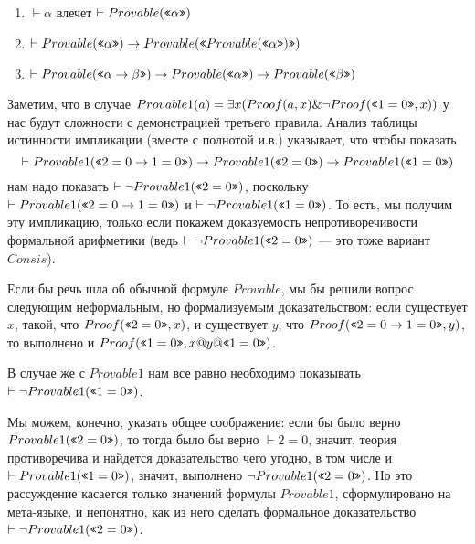\begin{enumerate}
\item $\vdash \alpha$ влечет $\vdash Provable(\texttt{<<}\alpha\texttt{>>})$
\item $\vdash Provable (\texttt{<<}\alpha\texttt{>>}) \rightarrow Provable(\texttt{<<}Provable(\texttt{<<}\alpha\texttt{>>})\texttt{>>})$
\item $\vdash Provable (\texttt{<<}\alpha\rightarrow \beta\texttt{>>})\rightarrow Provable(\texttt{<<}\alpha\texttt{>>}) \rightarrow Provable(\texttt{<<}\beta\texttt{>>})$
\end{enumerate}

Заметим, что в случае $Provable1(a) = \exists x (Proof (a,x) \& \neg Proof (\texttt{<<}1=0\texttt{>>},x))$
у нас будут сложности с демонстрацией третьего правила. 
Анализ таблицы истинности импликации (вместе с полнотой и.в.)
указывает, что чтобы показать 
$$\vdash Provable1 (\texttt{<<}2=0\rightarrow 1=0\texttt{>>}) \rightarrow Provable1 (\texttt{<<}2=0\texttt{>>}) \rightarrow Provable1 (\texttt{<<}1=0\texttt{>>})$$
нам надо показать $\vdash \neg Provable1 (\texttt{<<}2=0\texttt{>>})$,
поскольку $\vdash Provable1 (\texttt{<<}2=0\rightarrow 1=0\texttt{>>})$ и $\vdash \neg Provable1 (\texttt{<<}1=0\texttt{>>})$. 
То есть, мы получим эту импликацию, только если покажем доказуемость непротиворечивости формальной арифметики
(ведь $\vdash \neg Provable1 (\texttt{<<}2=0\texttt{>>})$ --- это тоже вариант $Consis$).

Если бы речь шла об обычной формуле $Provable$, мы бы решили вопрос следующим неформальным, но формализуемым
доказательством:
если существует $x$, такой, что $Proof (\texttt{<<}2=0\texttt{>>},x)$, 
и существует $y$, что $Proof(\texttt{<<}2=0\rightarrow 1=0\texttt{>>},y)$, 
то выполнено и $Proof (\texttt{<<}1=0\texttt{>>},x @ y @ \texttt{<<}1=0\texttt{>>})$.


В случае же с $Provable1$ нам все равно необходимо показывать $\vdash \neg Provable1 (\texttt{<<}1=0\texttt{>>})$.

Мы можем, конечно, указать общее соображение: если бы было верно $Provable1 (\texttt{<<}2=0\texttt{>>})$, то 
тогда было бы верно $\vdash 2=0$, значит, теория противоречива и найдется доказательство чего угодно, 
в том числе и $\vdash Provable1 (\texttt{<<}1=0\texttt{>>})$, значит, выполнено $\neg Provable1 (\texttt{<<}2=0\texttt{>>})$.
Но это рассуждение касается только значений формулы $Provable1$, сформулировано на мета-языке, 
и непонятно, как из него сделать формальное доказательство $\vdash \neg Provable1 (\texttt{<<}2=0\texttt{>>})$.

